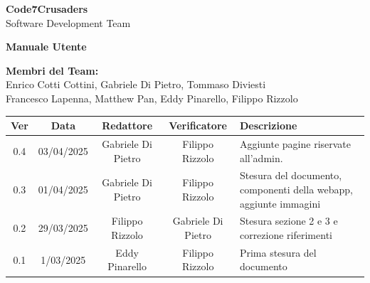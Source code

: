\documentclass{article}
\begin{document}
\begin{titlepage}
    {\Huge \textbf{Code7Crusaders}}\\
    \vspace{0.5cm}
    {\Large Software Development Team}\\
    \vspace{2cm}
    
    \large \textbf{Manuale Utente}
    \vspace{3.9cm}

    \textbf{Membri del Team:}\\
    Enrico Cotti Cottini, Gabriele Di Pietro, Tommaso Diviesti \\
    Francesco Lapenna, Matthew Pan, Eddy Pinarello, Filippo Rizzolo \\
    \vspace{0.5cm}
    
    \vspace{1cm}
\end{titlepage}



\newpage
\begin{table}[h]
    \centering
    \renewcommand{\arraystretch}{1.2}
    \setlength{\tabcolsep}{5pt}
    \begin{tabular}{|c|c|c|c|m{}|}
        \hline
        \textbf{Ver} & \textbf{Data} & \textbf{Redattore} & \textbf{Verificatore} & \textbf{Descrizione} \\
        \hline
        0.4 & 03/04/2025 & Gabriele Di Pietro & Filippo Rizzolo & Aggiunte pagine riservate all'admin.\\
        0.3 & 01/04/2025 & Gabriele Di Pietro & Filippo Rizzolo & Stesura del documento, componenti della webapp, aggiunte immagini \\
        0.2 & 29/03/2025 & Filippo Rizzolo & Gabriele Di Pietro & Stesura sezione 2 e 3 e correzione riferimenti \\
        0.1 & 1/03/2025 & Eddy Pinarello & Filippo Rizzolo & Prima stesura del documento \\
        \hline
    \end{tabular}
\end{table}


\newpage
\tableofcontents
\listoftables
\listoffigures

\newpage



\newpage



\newpage



\newpage



\newpage


\end{document}
